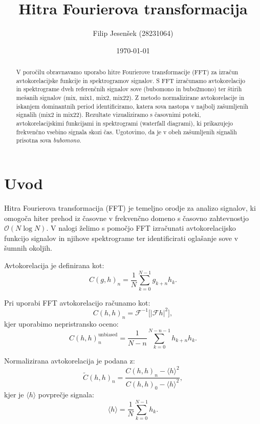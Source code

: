 \documentclass[12pt,a4paper]{article}
\title{Hitra Fourierova transformacija}
\author{Filip Jesenšek (28231064)}
\date{\today}
\begin{document}
\maketitle

\begin{abstract}
V poročilu obravnavamo uporabo hitre Fourierove transformacije (FFT) za izračun avtokorelacijske funkcije in spektrogramov signalov. S FFT izračunamo avtokorelacijo in spektrograme dveh referenčnih signalov sove (bubomono in bubo2mono) ter štirih mešanih signalov (mix, mix1, mix2, mix22). Z metodo normalizirane avtokorelacije in iskanjem dominantnih period identificiramo, katera sova nastopa v najbolj zašumljenih signalih (mix2 in mix22). Rezultate vizualiziramo s časovnimi poteki, avtokorelacijskimi funkcijami in spektrogrami (waterfall diagrami), ki prikazujejo frekvenčno vsebino signala skozi čas. Ugotovimo, da je v obeh zašumljenih signalih prisotna sova \textit{bubomono}.
\end{abstract}

\section{Uvod}

Hitra Fourierova transformacija (FFT) je temeljno orodje za analizo signalov, ki omogoča hiter prehod iz časovne v frekvenčno domeno s časovno zahtevnostjo $\mathcal{O}(N \log N)$. V nalogi želimo s pomočjo FFT izračunati avtokorelacijsko funkcijo signalov in njihove spektrograme ter identificirati oglašanje sove v šumnih okoljih.

Avtokorelacija je definirana kot:
\begin{equation}
C(g,h)_n = \frac{1}{N} \sum_{k=0}^{N-1} g_{k+n} h_k.
\end{equation}

Pri uporabi FFT avtokorelacijo računamo kot:
\begin{equation}
C(h,h)_n = \mathcal{F}^{-1}\big[|\mathcal{F}h|^2\big],
\end{equation}
kjer uporabimo nepristransko oceno:
\begin{equation}
C(h,h)_n^{\text{unbiased}} = \frac{1}{N-n} \sum_{k=0}^{N-n-1} h_{k+n} h_k.
\end{equation}

Normalizirana avtokorelacija je podana z:
\begin{equation}
\tilde{C}(h,h)_n = \frac{C(h,h)_n - \langle h \rangle^2}{C(h,h)_0 - \langle h \rangle^2},
\end{equation}
kjer je $\langle h \rangle$ povprečje signala:
\begin{equation}
\langle h \rangle = \frac{1}{N} \sum_{k=0}^{N-1} h_k.
\end{equation}
\end{document}

